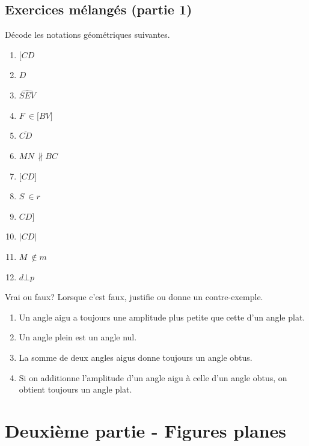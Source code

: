 \documentclass[../../syllabus_1.tex]{subfiles}
\begin{document}
\subsection{Exercices mélangés (partie 1)}
\begin{exercise}
    Décode les notations géométriques suivantes.
    \begin{enumerate}[cols=4]
        \item \(\lbrack CD\)
        \item \(D\)
        \item \(\widehat{SEV}\)
        \item \(F\  \in \lbrack BV\rbrack\)
        \item \(\overline{CD}\)
        \item \(MN\  \nparallel BC\)
        \item \(\lbrack CD\rbrack\)
        \item \(S\  \in r\)
        \item \(CD\rbrack\)
        \item \(|CD|\)
        \item \(M\  \notin m\)
        \item \(d \bot p\)
    \end{enumerate}
\end{exercise}

\begin{exercise}
    Vrai ou faux? Lorsque c'est faux, justifie ou donne un contre-exemple.
    \begin{enumerate}
        \item Un angle aigu a toujours une amplitude plus petite que cette d'un angle plat.
        \item Un angle plein est un angle nul.
        \item La somme de deux angles aigus donne toujours un angle obtus.
        \item Si on additionne l'amplitude d'un angle aigu à celle d'un angle obtus, on obtient toujours un angle plat.
    \end{enumerate}
\end{exercise}

\newpage
\section{Deuxième partie - Figures planes}
\end{document}

